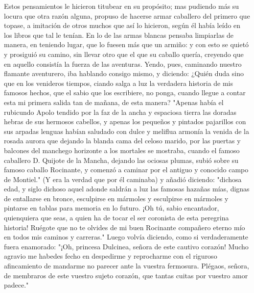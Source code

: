 \documentclass[12pt,
               twocolumn
              ]{article}
\begin{document}
\begin{flushleft}
Estos pensamientos le hicieron titubear en su propósito; mas pudiendo
más su locura que otra razón alguna, propuso de hacerse armar
caballero del primero que topase, a imitación de otros muchos que así
lo hicieron, según él había leído en los libros que tal le tenían. En
lo de las armas blancas pensaba limpiarlas de manera, en teniendo
lugar, que lo fuesen más que un armiño: y con esto se quietó y
prosiguió su camino, sin llevar otro que el que su caballo quería,
creyendo que en aquello consistía la fuerza de las aventuras. Yendo,
pues, caminando nuestro flamante aventurero, iba hablando consigo
mismo, y diciendo: ¿Quién duda sino que en los venideros tiempos,
ciando salga a luz la verdadera historia de mis famosos hechos, que el
sabio que los escribiere, no ponga, cuando llegue a contar esta mi
primera salida tan de mañana, de esta manera? "Apenas había el
rubicundo Apolo tendido por la faz de la ancha y espaciosa tierra las
doradas hebras de sus hermosos cabellos, y apenas los pequeños y
pintados pajarillos con sus arpadas lenguas habían saludado con dulce
y meliflua armonía la venida de la rosada aurora que dejando la blanda
cama del celoso marido, por las puertas y balcones del manchego
horizonte a los mortales se mostraba, cuando el famoso caballero
D. Quijote de la Mancha, dejando las ociosas plumas, subió sobre su
famoso caballo Rocinante, y comenzó a caminar por el antiguo y
conocido campo de Montiel." (Y era la verdad que por él caminaba) y
añadió diciendo: "dichosa edad, y siglo dichoso aquel adonde saldrán a
luz las famosas hazañas mías, dignas de entallarse en bronce,
esculpirse en mármoles y esculpirse en mármoles y pintarse en tablas
para memoria en lo futuro. ¡Oh tú, sabio encantador, quienquiera que
seas, a quien ha de tocar el ser coronista de esta peregrina historia!
Ruégote que no te olvides de mi buen Rocinante compañero eterno mío en
todos mis caminos y carreras." Luego volvía diciendo, como si
verdaderamente fuera enamorado: "¡Oh, princesa Dulcinea, señora de
este cautivo corazón! Mucho agravio me habedes fecho en despedirme y
reprocharme con el riguroso afincamiento de mandarme no parecer ante
la vuestra fermosura. Plégaos, señora, de membraros de este vuestro
sujeto corazón, que tantas cuitas por vuestro amor padece."  
\end{flushleft}
\end{document}
